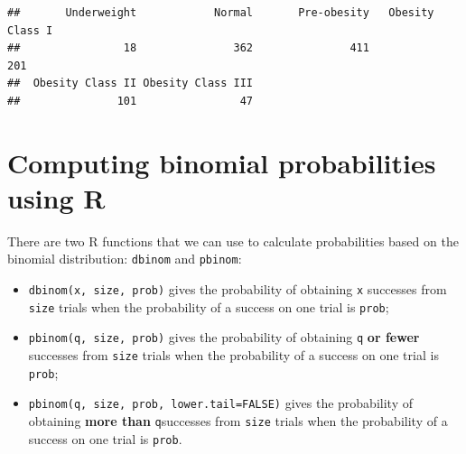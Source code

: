 \documentclass[
]{memoir}
\newenvironment{Shaded}{\begin{snugshade}}{\end{snugshade}}
\newcommand{\AttributeTok}[1]{\textcolor[rgb]{0.77,0.63,0.00}{#1}}
\newcommand{\ConstantTok}[1]{\textcolor[rgb]{0.00,0.00,0.00}{#1}}
\newcommand{\DecValTok}[1]{\textcolor[rgb]{0.00,0.00,0.81}{#1}}
\newcommand{\FloatTok}[1]{\textcolor[rgb]{0.00,0.00,0.81}{#1}}
\newcommand{\FunctionTok}[1]{\textcolor[rgb]{0.00,0.00,0.00}{#1}}
\newcommand{\NormalTok}[1]{#1}
\newcommand{\OtherTok}[1]{\textcolor[rgb]{0.56,0.35,0.01}{#1}}
\newcommand{\SpecialCharTok}[1]{\textcolor[rgb]{0.00,0.00,0.00}{#1}}
\newcommand{\StringTok}[1]{\textcolor[rgb]{0.31,0.60,0.02}{#1}}
\providecommand{\tightlist}{%
  \setlength{\itemsep}{0pt}\setlength{\parskip}{0pt}}
\begin{document}
\begin{Shaded}
\end{Shaded}

\begin{verbatim}
##       Underweight            Normal       Pre-obesity   Obesity Class I 
##                18               362               411               201 
##  Obesity Class II Obesity Class III 
##               101                47
\end{verbatim}

\hypertarget{computing-binomial-probabilities-using-r}{%
\section{Computing binomial probabilities using R}\label{computing-binomial-probabilities-using-r}}

There are two R functions that we can use to calculate probabilities based on the binomial distribution: \texttt{dbinom} and \texttt{pbinom}:

\begin{itemize}
\tightlist
\item
  \texttt{dbinom(x,\ size,\ prob)} gives the probability of obtaining \texttt{x} successes from \texttt{size} trials when the probability of a success on one trial is \texttt{prob};
\item
  \texttt{pbinom(q,\ size,\ prob)} gives the probability of obtaining \texttt{q} \textbf{or fewer} successes from \texttt{size} trials when the probability of a success on one trial is \texttt{prob};
\item
  \texttt{pbinom(q,\ size,\ prob,\ lower.tail=FALSE)} gives the probability of obtaining \textbf{more than} \texttt{q}successes from \texttt{size} trials when the probability of a success on one trial is \texttt{prob}.
\end{itemize}
\end{document}
